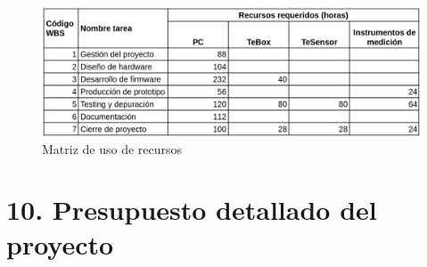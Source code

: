 \documentclass[11pt]{charter}
\begin{document}

\begin{figure}[htpb]
\centering 
\includegraphics[width=1\textwidth]{./Figuras/matrizUsoRecursos.png}
\caption{Matriz de uso de recursos}
\label{fig:matrizRecursos}
\end{figure}


\section{10. Presupuesto detallado del proyecto}
\label{sec:presupuesto}
\end{document}
